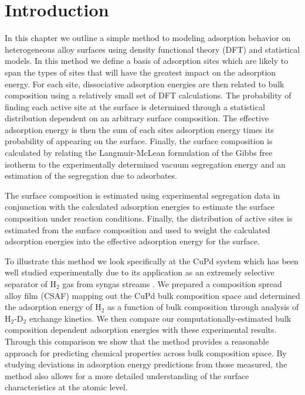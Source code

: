 \documentclass[12pt]{cmuthesis}
\begin{document}
\section{Introduction}
\label{sec:orgc417513}
In this chapter we outline a simple method to modeling adsorption behavior on heterogeneous alloy surfaces using density functional theory (DFT) and statistical models. In this method we define a basis of adsorption sites which are likely to span the types of sites that will have the greatest impact on the adsorption energy. For each site, dissociative adsorption energies are then related to bulk composition using a relatively small set of DFT calculations. The probability of finding each active site at the surface is determined through a statistical distribution dependent on an arbitrary surface composition. The effective adsorption energy is then the sum of each sites adsorption energy times its probability of appearing on the surface. Finally, the surface composition is calculated by relating the Langmuir-McLean formulation of the Gibbs free isotherm to the experimentally determined vacuum segregation energy and an estimation of the segregation due to adsorbates.

The surface composition is estimated using experimental segregation data in conjunction with the calculated adsorption energies to estimate the surface composition under reaction conditions. Finally, the distribution of active sites is estimated from the surface composition and used to weight the calculated adsorption energies into the effective adsorption energy for the surface.

To illustrate this method we look specifically at the CuPd system which has been well studied experimentally due to its application as an extremely selective separator of H\(_{\text{2}}\) gas from syngas streams \cite{kamakoti-2005-predic-hydrog,obrien-2011-kinet-h,obrien-2012-h-d}. We prepared a composition spread alloy film (CSAF) \cite{fleutot-2012-appar-depos} mapping out the CuPd bulk composition space and determined the adsorption energy of H\(_{\text{2}}\) as a function of bulk composition through analysis of H\(_{\text{2}}\)-D\(_{\text{2}}\) exchange kinetics. We then compare our computationally-estimated bulk composition dependent adsorption energies with these experimental results. Through this comparison we show that the method provides a reasonable approach for predicting chemical properties across bulk composition space. By studying deviations in adsorption energy predictions from those measured, the method also allows for a more detailed understanding of the surface characteristics at the atomic level.
\end{document}
